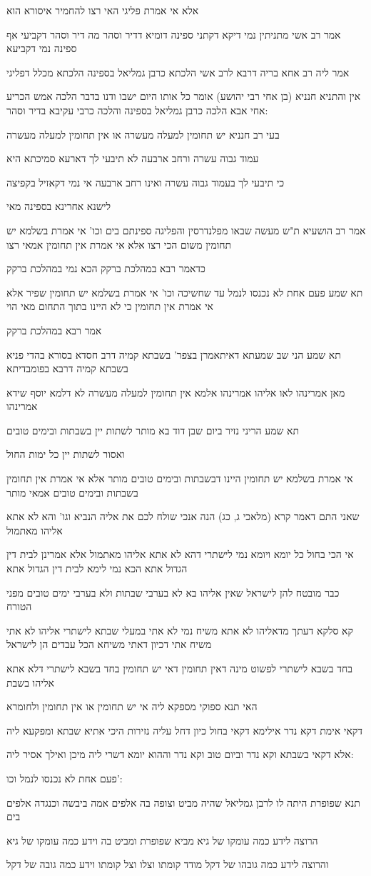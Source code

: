 \documentclass[12pt, openany]{book}
\newcommand{\sethebfont}{
\fontsize{10.5pt}{21.0pt} \selectfont
}
\newcommand{\textblock}[1]{
{\sethebfont #1\\}	
}
\begin{document}
\textblock{אלא אי אמרת פליגי האי רצו להחמיר איסורא הוא}
\textblock{אמר רב אשי מתניתין נמי דיקא דקתני ספינה דומיא דדיר וסהר מה דיר וסהר דקביעי אף ספינה נמי דקביעא}
\textblock{אמר ליה רב אחא בריה דרבא לרב אשי הלכתא כרבן גמליאל בספינה הלכתא מכלל דפליגי}
\textblock{אין והתניא חנניא (בן אחי רבי יהושע) אומר כל אותו היום ישבו ודנו בדבר הלכה אמש הכריע אחי אבא הלכה כרבן גמליאל בספינה והלכה כרבי עקיבא בדיר וסהר:}
\textblock{בעי רב חנניא יש תחומין למעלה מעשרה או אין תחומין למעלה מעשרה}
\textblock{עמוד גבוה עשרה ורחב ארבעה לא תיבעי לך דארעא סמיכתא היא}
\textblock{כי תיבעי לך בעמוד גבוה עשרה ואינו רחב ארבעה אי נמי דקאזיל בקפיצה}
\textblock{לישנא אחרינא בספינה מאי}
\textblock{אמר רב הושעיא ת"ש מעשה שבאו מפלנדרסין והפליגה ספינתם בים וכו' אי אמרת בשלמא יש תחומין משום הכי רצו אלא אי אמרת אין תחומין אמאי רצו}
\textblock{כדאמר רבא במהלכת ברקק הכא נמי במהלכת ברקק}
\textblock{תא שמע פעם אחת לא נכנסו לנמל עד שחשיכה וכו' אי אמרת בשלמא יש תחומין שפיר אלא אי אמרת אין תחומין כי לא היינו בתוך התחום מאי הוי}
\textblock{אמר רבא במהלכת ברקק}
\textblock{תא שמע הני שב שמעתא דאיתאמרן בצפר' בשבתא קמיה דרב חסדא בסורא בהדי פניא בשבתא קמיה דרבא בפומבדיתא}
\textblock{מאן אמרינהו לאו אליהו אמרינהו אלמא אין תחומין למעלה מעשרה לא דלמא יוסף שידא אמרינהו}
\textblock{תא שמע הריני נזיר ביום שבן דוד בא מותר לשתות יין בשבתות ובימים טובים}
\textblock{ואסור לשתות יין כל ימות החול}
\textblock{אי אמרת בשלמא יש תחומין היינו דבשבתות ובימים טובים מותר אלא אי אמרת אין תחומין בשבתות ובימים טובים אמאי מותר}
\textblock{שאני התם דאמר קרא (מלאכי ג, כג) הנה אנכי שולח לכם את אליה הנביא וגו' והא לא אתא אליהו מאתמול}
\textblock{אי הכי בחול כל יומא ויומא נמי לישתרי דהא לא אתא אליהו מאתמול אלא אמרינן לבית דין הגדול אתא הכא נמי לימא לבית דין הגדול אתא}
\textblock{כבר מובטח להן לישראל שאין אליהו בא לא בערבי שבתות ולא בערבי ימים טובים מפני הטורח}
\textblock{קא סלקא דעתך מדאליהו לא אתא משיח נמי לא אתי במעלי שבתא לישתרי אליהו לא אתי משיח אתי דכיון דאתי משיחא הכל עבדים הן לישראל}
\textblock{בחד בשבא לישתרי לפשוט מינה דאין תחומין דאי יש תחומין בחד בשבא לישתרי דלא אתא אליהו בשבת}
\textblock{האי תנא ספוקי מספקא ליה אי יש תחומין או אין תחומין ולחומרא}
\textblock{דקאי אימת דקא נדר אילימא דקאי בחול כיון דחל עליה נזירות היכי אתיא שבתא ומפקעא ליה}
\textblock{אלא דקאי בשבתא וקא נדר וביום טוב וקא נדר וההוא יומא דשרי ליה מיכן ואילך אסיר ליה:}
\textblock{פעם אחת לא נכנסו לנמל וכו':}
\textblock{תנא שפופרת היתה לו לרבן גמליאל שהיה מביט וצופה בה אלפים אמה ביבשה וכנגדה אלפים בים}
\textblock{הרוצה לידע כמה עומקו של גיא מביא שפופרת ומביט בה וידע כמה עומקו של גיא}
\textblock{והרוצה לידע כמה גובהו של דקל מודד קומתו וצלו וצל קומתו וידע כמה גובה של דקל}
\end{document}
